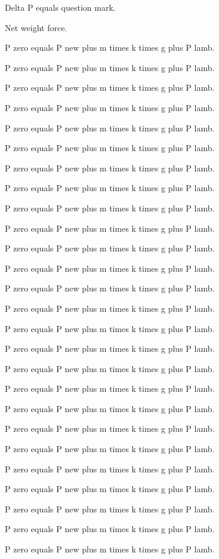 Delta P equals question mark. 

Net weight force. 

P zero equals P new plus m times k times g plus P lamb. 

P zero equals P new plus m times k times g plus P lamb. 

P zero equals P new plus m times k times g plus P lamb. 

P zero equals P new plus m times k times g plus P lamb. 

P zero equals P new plus m times k times g plus P lamb. 

P zero equals P new plus m times k times g plus P lamb. 

P zero equals P new plus m times k times g plus P lamb. 

P zero equals P new plus m times k times g plus P lamb. 

P zero equals P new plus m times k times g plus P lamb. 

P zero equals P new plus m times k times g plus P lamb. 

P zero equals P new plus m times k times g plus P lamb. 

P zero equals P new plus m times k times g plus P lamb. 

P zero equals P new plus m times k times g plus P lamb. 

P zero equals P new plus m times k times g plus P lamb. 

P zero equals P new plus m times k times g plus P lamb. 

P zero equals P new plus m times k times g plus P lamb. 

P zero equals P new plus m times k times g plus P lamb. 

P zero equals P new plus m times k times g plus P lamb. 

P zero equals P new plus m times k times g plus P lamb. 

P zero equals P new plus m times k times g plus P lamb. 

P zero equals P new plus m times k times g plus P lamb. 

P zero equals P new plus m times k times g plus P lamb. 

P zero equals P new plus m times k times g plus P lamb. 

P zero equals P new plus m times k times g plus P lamb. 

P zero equals P new plus m times k times g plus P lamb. 

P zero equals P new plus m times k times g plus P lamb. 

